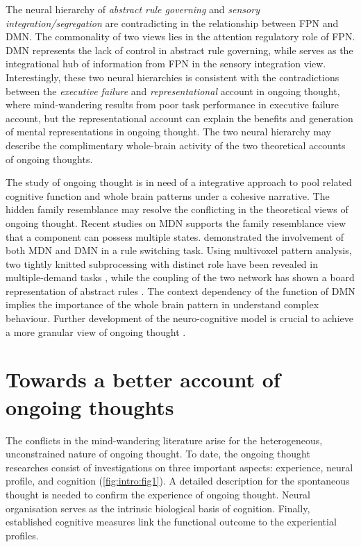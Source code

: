 The neural hierarchy of \textit{abstract rule governing} and \textit{sensory integration/segregation} are contradicting in the relationship between FPN and DMN. The commonality of two views lies in the attention regulatory role of FPN. DMN represents the lack of control in abstract rule governing, while serves as the integrational hub of information from FPN in the sensory integration view. Interestingly, these two neural hierarchies is consistent with the contradictions between the \textit{executive failure} and \textit{representational} account in ongoing thought, where mind-wandering results from poor task performance in executive failure account, but the representational account can explain the benefits and generation of mental representations in ongoing thought. The two neural hierarchy may describe the complimentary whole-brain activity of the two theoretical accounts of ongoing thoughts. 

The study of ongoing thought is in need of a integrative approach to pool related cognitive function and whole brain patterns under a cohesive narrative. The hidden family resemblance may resolve the conflicting in the theoretical views of ongoing thought. Recent studies on MDN supports the family resemblance view that a component can possess multiple states.  demonstrated the involvement of both MDN and DMN in a rule switching task. Using multivoxel pattern analysis, two tightly knitted subprocessing with distinct role have been revealed in multiple-demand tasks \cite{Crittenden2015}, while the coupling of the two network has shown a board representation of abstract rules \cite{Crittenden2016}. The context dependency of the function of DMN implies the importance of the whole brain pattern in understand complex behaviour. Further development of the neuro-cognitive model is crucial to achieve a more granular view of ongoing thought \cite{Mittner2016,SmallwoodFrontiers2013}. 

\section{Towards a better account of ongoing thoughts}

The conflicts in the mind-wandering literature arise for the heterogeneous, unconstrained nature of ongoing thought. To date, the ongoing thought researches consist of investigations on three important aspects: experience, neural profile, and cognition (\cref{fig:intro:fig1}). A detailed description for the spontaneous thought is needed to confirm the experience of ongoing thought. Neural organisation serves as the intrinsic biological basis of cognition. Finally, established cognitive measures link the functional outcome to the experiential profiles. 

